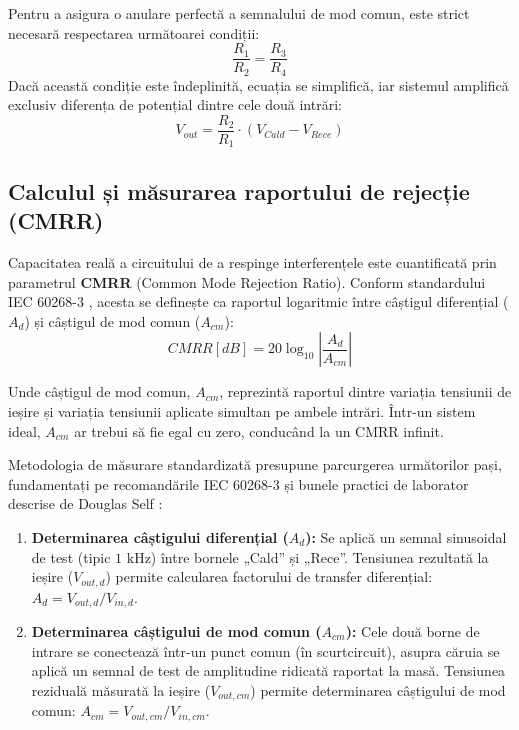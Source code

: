 Pentru a asigura o anulare perfectă a semnalului de mod comun, este strict necesară respectarea următoarei condiții:
\begin{equation}
    \frac{R_1}{R_2} = \frac{R_3}{R_4}
\end{equation}
Dacă această condiție este îndeplinită, ecuația se simplifică, iar sistemul amplifică exclusiv diferența de potențial dintre cele două intrări:
\begin{equation}
    V_{out} = \frac{R_2}{R_1} \cdot (V_{Cald} - V_{Rece})
\end{equation}

\subsection{Calculul și măsurarea raportului de rejecție (CMRR)}
Capacitatea reală a circuitului de a respinge interferențele este cuantificată prin parametrul \textbf{CMRR} (Common Mode Rejection Ratio). Conform standardului IEC 60268-3 \cite{iec60268_3}, acesta se definește ca raportul logaritmic între câștigul diferențial ($A_d$) și câștigul de mod comun ($A_{cm}$):
\begin{equation}
    CMRR [dB] = 20 \log_{10} \left| \frac{A_d}{A_{cm}} \right|
\end{equation}

Unde câștigul de mod comun, $A_{cm}$, reprezintă raportul dintre variația tensiunii de ieșire și variația tensiunii aplicate simultan pe ambele intrări. Într-un sistem ideal, $A_{cm}$ ar trebui să fie egal cu zero, conducând la un CMRR infinit.

Metodologia de măsurare standardizată presupune parcurgerea următorilor pași, fundamentați pe recomandările IEC 60268-3 \cite{iec60268_3} și bunele practici de laborator descrise de Douglas Self \cite{douglasself}:
\begin{enumerate}
    \item \textbf{Determinarea câștigului diferențial ($A_d$):} Se aplică un semnal sinusoidal de test (tipic $1\text{ kHz}$) între bornele „Cald” și „Rece”. Tensiunea rezultată la ieșire ($V_{out,d}$) permite calcularea factorului de transfer diferențial: $A_d = V_{out,d} / V_{in,d}$.
    \item \textbf{Determinarea câștigului de mod comun ($A_{cm}$):} Cele două borne de intrare se conectează într-un punct comun (în scurtcircuit), asupra căruia se aplică un semnal de test de amplitudine ridicată raportat la masă. Tensiunea reziduală măsurată la ieșire ($V_{out,cm}$) permite determinarea câștigului de mod comun: $A_{cm} = V_{out,cm} / V_{in,cm}$.
\end{enumerate}

